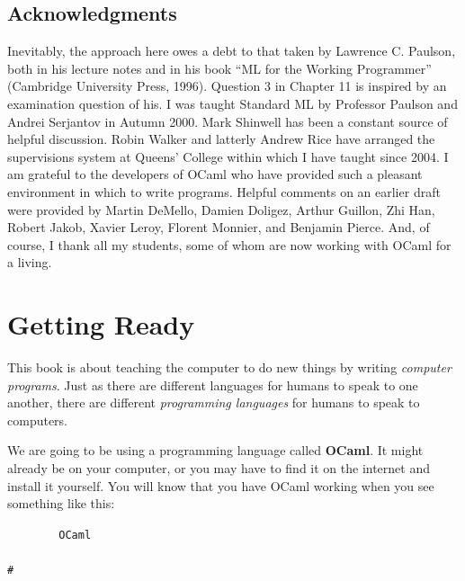 \documentclass[]{book}
\newcommand{\smspace}{\vspace{4mm}}
\begin{document}
\section*{Acknowledgments}

Inevitably, the approach here owes a debt to that taken by Lawrence C. Paulson, both in his lecture notes and in his book ``ML for the Working Programmer'' (Cambridge University Press, 1996). Question 3 in Chapter 11 is inspired by an examination question of his. I was taught Standard ML by Professor Paulson and Andrei Serjantov in Autumn 2000. Mark Shinwell has been a constant source of helpful discussion. Robin Walker and latterly Andrew Rice have arranged the supervisions system at Queens' College within which I have taught since 2004. I am grateful to the developers of OCaml who have provided such a pleasant environment in which to write programs. Helpful comments on an earlier draft were provided by Martin DeMello, Damien Doligez, Arthur Guillon, Zhi Han, Robert Jakob, Xavier Leroy, Florent Monnier, and Benjamin Pierce. And, of course, I thank all my students, some of whom are now working with OCaml for a living.

\pagestyle{empty}


\chapter{Getting Ready}

This book is about teaching the computer to do new things by writing \textit{computer programs}. Just as there are different languages for humans to speak to one another, there are different \textit{programming languages} for humans to speak to computers.

We are going to be using a programming language called \textbf{OCaml}. It might already be on your computer, or you may have to find it on the internet and install it yourself. You will know that you have OCaml working when you see something like this:

\smspace
\noindent\verb!        OCaml!\\
\noindent\\
\noindent\verb!#!
\smspace


\end{document}
